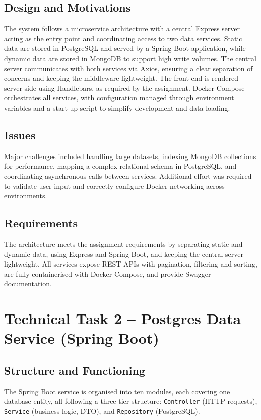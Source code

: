 \documentclass[12pt,a4paper]{article}
\begin{document}
\subsection{Design and Motivations}

The system follows a microservice architecture with a central Express server acting as the entry point and coordinating access to two data services. Static data are stored in PostgreSQL and served by a Spring Boot application, while dynamic data are stored in MongoDB to support high write volumes. The central server communicates with both services via Axios, ensuring a clear separation of concerns and keeping the middleware lightweight. The front-end is rendered server-side using Handlebars, as required by the assignment. Docker Compose orchestrates all services, with configuration managed through environment variables and a start-up script to simplify development and data loading.

\subsection{Issues}

Major challenges included handling large datasets, indexing MongoDB collections for performance, mapping a complex relational schema in PostgreSQL, and coordinating asynchronous calls between services. Additional effort was required to validate user input and correctly configure Docker networking across environments.

\subsection{Requirements}

The architecture meets the assignment requirements by separating static and dynamic data, using Express and Spring Boot, and keeping the central server lightweight. All services expose REST APIs with pagination, filtering and sorting, are fully containerised with Docker Compose, and provide Swagger documentation.
\section{Technical Task 2 -- Postgres Data Service (Spring Boot)}

\subsection{Structure and Functioning}

The Spring Boot service is organised into ten modules, each covering one database entity, all following a three-tier structure: \texttt{Controller} (HTTP requests), \texttt{Service} (business logic, DTO), and \texttt{Repository} (PostgreSQL).
\end{document}
